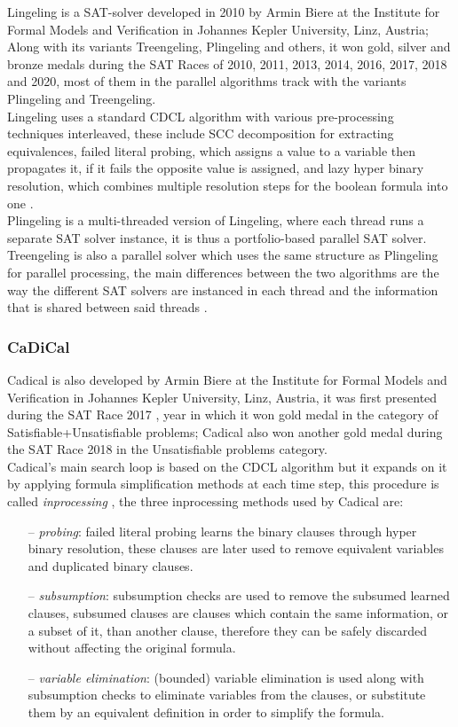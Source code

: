 Lingeling is a SAT-solver developed in 2010 by Armin Biere at the Institute for Formal Models and Verification in Johannes Kepler University, Linz, Austria; Along with its variants Treengeling, Plingeling and others, it won gold, silver and bronze medals during the SAT Races of 2010, 2011, 2013, 2014, 2016, 2017, 2018 and 2020, most of them in the parallel algorithms track with the variants Plingeling and Treengeling.
\\Lingeling uses a standard CDCL algorithm with various pre-processing techniques interleaved, these include SCC decomposition for extracting equivalences, failed literal probing, which assigns a value to a variable then propagates it, if it fails the opposite value is assigned, and lazy hyper binary resolution, which combines multiple resolution steps for the boolean formula into one \parencite{Biere2010}.
\\Plingeling is a multi-threaded version of Lingeling, where each thread runs a separate SAT solver instance, it is thus a portfolio-based parallel SAT solver.
\\Treengeling is also a parallel solver which uses the same structure as Plingeling for parallel processing, the main differences between the two algorithms are the way the different SAT solvers are instanced in each thread and the information that is shared between said threads \parencite{Biere2012}.

\subsubsection{CaDiCal}

Cadical is also developed by Armin Biere at the Institute for Formal Models and Verification in Johannes Kepler University, Linz, Austria, it was first presented during the SAT Race 2017 \parencite{Biere2017}, year in which it won gold medal in the category of Satisfiable+Unsatisfiable problems; Cadical also won another gold medal during the SAT Race 2018 in the Unsatisfiable problems category.
\\Cadical's main search loop is based on the CDCL algorithm but it expands on it by applying formula simplification methods at each time step, this procedure is called \textit{inprocessing} \parencite{Jarvisalo2012}, the three inprocessing methods used by Cadical are:
\begin{itemize}
	\item[--]\textit{probing}: failed literal probing learns the binary clauses through hyper binary resolution, these clauses are later used to remove equivalent variables and duplicated binary clauses.
	\item[--]\textit{subsumption}: subsumption checks are used to remove the subsumed learned clauses, subsumed clauses are clauses which contain the same information, or a subset of it, than another clause, therefore they can be safely discarded without affecting the original formula.
	\item[--]\textit{variable elimination}: (bounded) variable elimination is used along with subsumption checks to eliminate variables from the clauses, or substitute them by an equivalent definition in order to simplify the formula.
\end{itemize}
